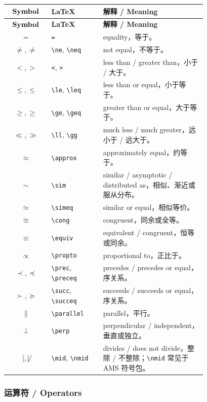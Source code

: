 \documentclass[11pt]{article}
\begin{document}
\begin{longtable}{>{$}c<{$} p{0.26\linewidth} p{0.52\linewidth}}
\hline
\text{\textbf{Symbol}} & \textbf{LaTeX} & \textbf{解释 / Meaning} \\
\hline
\endfirsthead
\hline
\text{\textbf{Symbol}} & \textbf{LaTeX} & \textbf{解释 / Meaning} \\
\hline
\endhead
= & \verb|=| & equality，等于。 \\
\ne, \neq & \verb|\ne|, \verb|\neq| & not equal，不等于。 \\
<, > & \verb|<|, \verb|>| & less than / greater than，小于 / 大于。 \\
\le, \leq & \verb|\le|, \verb|\leq| & less than or equal，小于等于。 \\
\ge, \geq & \verb|\ge|, \verb|\geq| & greater than or equal，大于等于。 \\
\ll, \gg & \verb|\ll|, \verb|\gg| & much less / much greater，远小于 / 远大于。 \\
\approx & \verb|\approx| & approximately equal，约等于。 \\
\sim & \verb|\sim| & similar / asymptotic / distributed as，相似、渐近或服从分布。 \\
\simeq & \verb|\simeq| & similar or equal，相似等价。 \\
\cong & \verb|\cong| & congruent，同余或全等。 \\
\equiv & \verb|\equiv| & equivalent / congruent，恒等或同余。 \\
\propto & \verb|\propto| & proportional to，正比于。 \\
\prec, \preceq & \verb|\prec|, \verb|\preceq| & precedes / precedes or equal，序关系。 \\
\succ, \succeq & \verb|\succ|, \verb|\succeq| & succeeds / succeeds or equal，序关系。 \\
\parallel & \verb|\parallel| & parallel，平行。 \\
\perp & \verb|\perp| & perpendicular / independent，垂直或独立。 \\
\mid, \not\mid & \verb|\mid|, \verb|\nmid| & divides / does not divide，整除 / 不整除；\verb|\nmid| 常见于 AMS 符号包。 \\
\hline
\end{longtable}

\subsubsection{运算符 / Operators}
\end{document}
